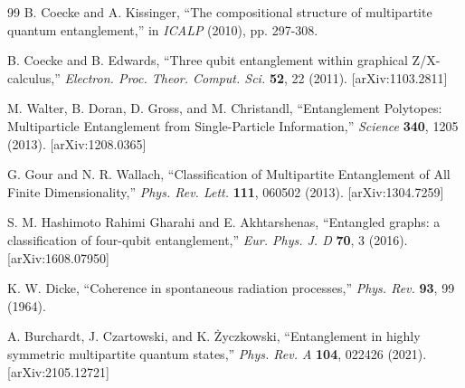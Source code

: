 \documentclass[12pt,a4paper]{article}
\begin{document}
\begin{thebibliography}{99}
	 B. Coecke and A. Kissinger, ``The compositional structure of multipartite quantum entanglement,'' in \textit{ICALP} (2010), pp. 297-308.

	 B. Coecke and B. Edwards, ``Three qubit entanglement within graphical Z/X-calculus,'' \textit{Electron. Proc. Theor. Comput. Sci.} \textbf{52}, 22 (2011). [arXiv:1103.2811]

	 M. Walter, B. Doran, D. Gross, and M. Christandl, ``Entanglement Polytopes: Multiparticle Entanglement from Single-Particle Information,'' \textit{Science} \textbf{340}, 1205 (2013). [arXiv:1208.0365]

	 G. Gour and N. R. Wallach, ``Classification of Multipartite Entanglement of All Finite Dimensionality,'' \textit{Phys. Rev. Lett.} \textbf{111}, 060502 (2013). [arXiv:1304.7259]

	 S. M. Hashimoto Rahimi Gharahi and E. Akhtarshenas, ``Entangled graphs: a classification of four-qubit entanglement,'' \textit{Eur. Phys. J. D} \textbf{70}, 3 (2016). [arXiv:1608.07950]

	 K. W. Dicke, ``Coherence in spontaneous radiation processes,'' \textit{Phys. Rev.} \textbf{93}, 99 (1964).


	 A. Burchardt, J. Czartowski, and K. Życzkowski, ``Entanglement in highly symmetric multipartite quantum states,'' \textit{Phys. Rev. A} \textbf{104}, 022426 (2021). [arXiv:2105.12721]




\end{thebibliography}
\end{document}
